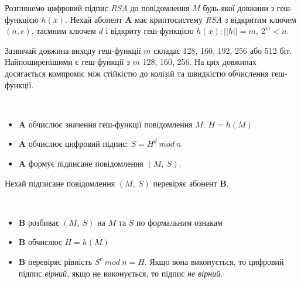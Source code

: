 Розглянемо цифровий підпис \textit{RSA} до повідомлення \( M \) будь-якої довжини з геш-функцією \( h(x) \).
Нехай абонент \textbf{A} має криптосистему \textit{RSA} з відкритим ключем \( \left( n, e \right) \), таємним ключем \( d \) і відкриту геш-функцією \( h(x) \colon ||h|| = m,\ 2^{m} < n \).
\begin{remark}
Зазвичай довжина виходу геш-функції \( m \) складає 128, 160, 192, 256 або 512 біт. Найпоширенішими є геш-функції з \( m \) 128, 160, 256. На цих довжинах досягається компроміс між стійкістю до колізій та швидкістю обчислення геш-функції.
\end{remark}
\begin{algorithm}\ 
\begin{itemize}
\item \textbf{A} обчислює значення геш-функції повідомлення \( M \): \( H = h(M) \)
\item \textbf{A} обчислює цифровий підпис: \( S = H^d\ mod\ n \)
\item \textbf{A} формує підписане повідомлення \( (M,\ S) \).
\end{itemize}
\end{algorithm}
Нехай підписане повідомлення \( (M,\ S) \) перевіряє абонент \textbf{B}.
\begin{algorithm}\ 
\begin{itemize}
\item \textbf{B} розбиває \( (M,\ S) \) на \( M \) та \( S \) по формальним ознакам
\item \textbf{B} обчислює \( H = h(M) \)
\item \textbf{B} перевіряє рівність \( S^e\ mod\ n = H \). Якщо вона виконується, то цифровий підпис \textit{вірний}, якщо не виконується, то підпис \textit{не вірний}.
\end{itemize}
\end{algorithm}

